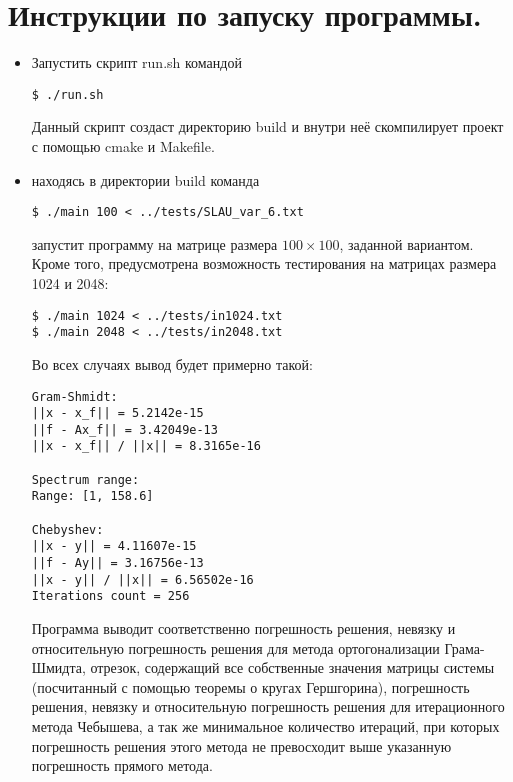 \documentclass[a4paper,12pt,titlepage,final]{article}
\begin{document}
\section{Инструкции по запуску программы.}
\begin{itemize}
    \item Запустить скрипт run.sh командой 
\begin{lstlisting}
$ ./run.sh 
\end{lstlisting} 
Данный скрипт создаст директорию build и внутри неё скомпилирует проект с помощью cmake и Makefile. 
    \item находясь в директории build команда 
\begin{lstlisting}
$ ./main 100 < ../tests/SLAU_var_6.txt
\end{lstlisting} 
    запустит программу на матрице размера $100 \times 100$, заданной вариантом. Кроме того, предусмотрена возможность тестирования на матрицах размера 1024 и 2048:
\begin{lstlisting}
$ ./main 1024 < ../tests/in1024.txt
$ ./main 2048 < ../tests/in2048.txt
\end{lstlisting} 
Во всех случаях вывод будет примерно такой:
\begin{lstlisting}
Gram-Shmidt:
||x - x_f|| = 5.2142e-15
||f - Ax_f|| = 3.42049e-13
||x - x_f|| / ||x|| = 8.3165e-16

Spectrum range:
Range: [1, 158.6]

Chebyshev:
||x - y|| = 4.11607e-15
||f - Ay|| = 3.16756e-13
||x - y|| / ||x|| = 6.56502e-16
Iterations count = 256
\end{lstlisting}
Программа выводит соответственно погрешность решения, невязку и относительную погрешность решения для метода ортогонализации Грама-Шмидта, отрезок, содержащий все собственные значения матрицы системы (посчитанный с помощью теоремы о кругах Гершгорина), погрешность решения, невязку и относительную погрешность решения для итерационного метода Чебышева, а так же минимальное количество итераций, при которых погрешность решения этого метода не превосходит выше указанную погрешность прямого метода.
\end{itemize}
\end{document}
